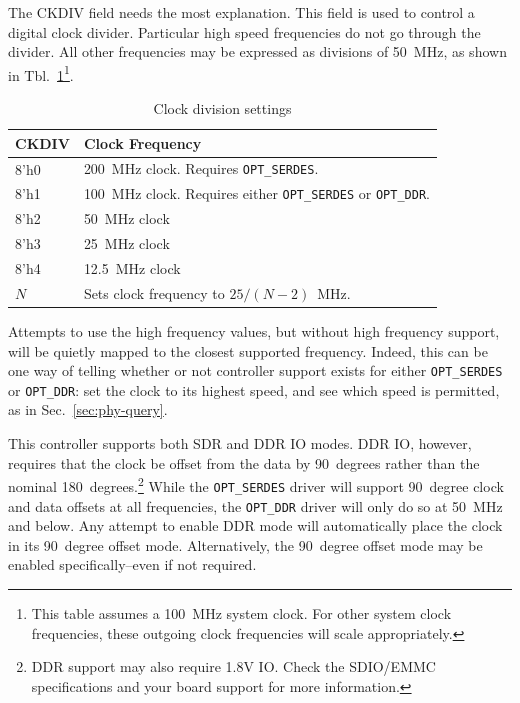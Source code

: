\documentclass{gqtekspec}
\begin{document}
The CKDIV field needs the most explanation.  This field is used to control
a digital clock divider.  Particular high speed frequencies do not go through
the divider.  All other frequencies may be expressed as divisions of 50~MHz,
as shown in Tbl.~\ref{tbl:CKDIV}\footnote{This table assumes a 100~MHz
system clock.  For other system clock frequencies, these outgoing clock
frequencies will scale appropriately.}.
\begin{table}\begin{center}
\begin{tabular}{|p{1.2in}|p{4.0in}|}\hline
	\rowcolor[gray]{0.85} CKDIV & Clock Frequency\\\hline\hline
8'h0 & 200~MHz clock.  Requires {\tt OPT\_SERDES}.\\
8'h1 & 100~MHz clock.  Requires either {\tt OPT\_SERDES} or {\tt OPT\_DDR}.\\
8'h2 &  50~MHz clock\\
8'h3 &  25~MHz clock\\
8'h4 &  12.5~MHz clock\\
$N$ & Sets clock frequency to $25 / \left(N-2\right)$~MHz.
	\\\hline
\end{tabular}
\caption{Clock division settings}\label{tbl:CKDIV}
\end{center}\end{table}
Attempts to use the high frequency values, but without high frequency
support, will be quietly mapped to the closest supported frequency.  Indeed,
this can be one way of telling whether or not controller support exists for
either {\tt OPT\_SERDES} or {\tt OPT\_DDR}: set the clock to its highest
speed, and see which speed is permitted, as in Sec.~\ref{sec:phy-query}.

This controller supports both SDR and DDR IO modes.  DDR IO, however, requires
that the clock be offset from the data by 90~degrees rather than the nominal
180~degrees.\footnote{DDR support may also require 1.8V IO.  Check the SDIO/EMMC
specifications and your board support for more information.}  While the
{\tt OPT\_SERDES} driver will support 90~degree clock and data offsets at all
frequencies, the {\tt OPT\_DDR} driver will only do so at 50~MHz and below.
Any attempt to enable DDR mode will automatically place the clock in its
90~degree offset mode.  Alternatively, the 90~degree offset mode may be
enabled specifically--even if not required.
\end{document}
